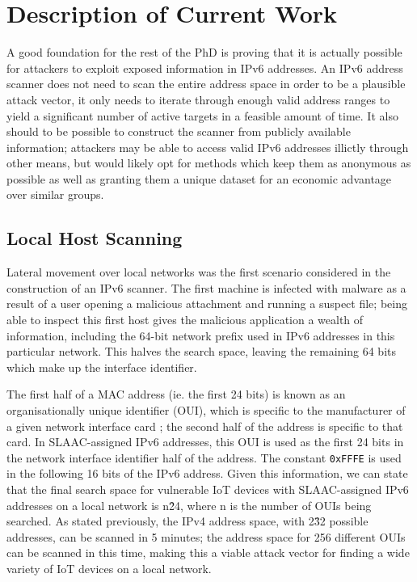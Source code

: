 \documentclass[10pt,sigconf]{acmart}
\begin{document}
\section{Description of Current Work}


A good foundation for the rest of the PhD is proving that it is actually possible for attackers to exploit exposed information in IPv6 addresses.
An IPv6 address scanner does not need to scan the entire address space in order to be a plausible attack vector, it only needs to iterate through enough valid address ranges to yield a significant number of active targets in a feasible amount of time.
It also should to be possible to construct the scanner from publicly available information; 
attackers may be able to access valid IPv6 addresses illictly through other means, but would likely opt for methods which keep them as anonymous as possible as well as granting them a unique dataset for an economic advantage over similar groups.

\subsection{Local Host Scanning}
Lateral movement over local networks was the first scenario considered in the construction of an IPv6 scanner.
The first machine is infected with malware as a result of a user opening a malicious attachment and running a suspect file;
being able to inspect this first host gives the malicious application a wealth of information, including the 64-bit network prefix used in IPv6 addresses in this particular network.
This halves the search space, leaving the remaining 64 bits which make up the interface identifier.

The first half of a MAC address (ie. the first 24 bits) is known as an organisationally unique identifier (OUI), which is specific to the manufacturer of a given network interface card \cite{oui-list};
the second half of the address is specific to that card.
In SLAAC-assigned IPv6 addresses, this OUI is used as the first 24 bits in the network interface identifier half of the address.
The constant \texttt{0xFFFE} is used in the following 16 bits of the IPv6 address.
Given this information, we can state that the final search space for vulnerable IoT devices with SLAAC-assigned IPv6 addresses on a local network is n\^24, where n is the number of OUIs being searched.
As stated previously, the IPv4 address space, with 2\^32 possible addresses, can be scanned in 5 minutes;
the address space for 256 different OUIs can be scanned in this time, making this a viable attack vector for finding a wide variety of IoT devices on a local network.
\end{document}
